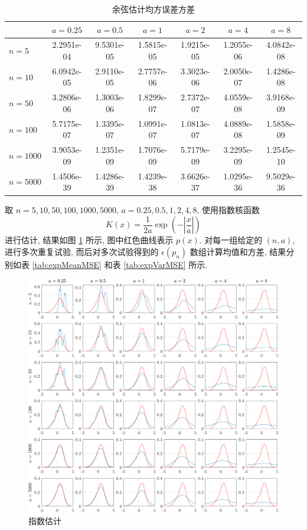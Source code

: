 \documentclass{article}
\begin{document}
\begin{table}[htbp]
  \centering
  \begin{tabular}{l|cccccc}
    \hline
             & $a=0.25$   & $a=0.5$    & $a=1$      & $a=2$      & $a=4$      & $a=8$      \\ \hline
    $n=5$    & 2.2951e-04 & 9.5301e-05 & 1.5815e-05 & 1.9215e-05 & 1.2055e-06 & 4.0842e-08 \\
    $n=10$   & 6.0942e-05 & 2.9110e-05 & 2.7757e-06 & 3.3023e-06 & 2.0050e-07 & 1.4286e-08 \\
    $n=50$   & 3.2806e-06 & 1.3003e-06 & 1.8299e-07 & 2.7372e-07 & 4.0559e-08 & 3.9168e-09 \\
    $n=100$  & 5.7175e-07 & 1.3395e-07 & 1.0991e-07 & 1.0813e-07 & 4.0889e-08 & 1.5858e-09 \\
    $n=1000$ & 3.9053e-09 & 1.2351e-09 & 1.7076e-09 & 5.7179e-09 & 3.2295e-09 & 1.2545e-10 \\
    $n=5000$ & 1.4506e-39 & 1.4286e-39 & 1.4239e-38 & 3.6626e-37 & 1.0295e-36 & 9.5029e-36 \\ \hline
  \end{tabular}
  \caption{余弦估计均方误差方差}
  \label{tab:cosVarMSE}
\end{table}

取 $n=5,10,50,100,1000,5000$, $a=0.25,0.5,1,2,4,8$, 使用指数核函数
\begin{equation}
  K(x)=\frac{1}{2a}\exp\left(-\left\lvert\frac{x}{a}\right\rvert\right)
\end{equation} 
进行估计, 结果如图 \ref{fig:expwin} 所示, 图中红色曲线表示 $p(x)$. 对每一组给定的 $(n,a)$, 进行多次重复试验, 而后对多次试验得到的 $\epsilon(p_n)$ 数组计算均值和方差, 结果分别如表 \ref{tab:expMeanMSE} 和表 \ref{tab:expVarMSE} 所示.

\begin{figure}[htbp]
  \centering
  \includegraphics[width=7in]{exponentialWindow.pdf}
  \caption{指数估计}
  \label{fig:expwin}
\end{figure}
\end{document}
